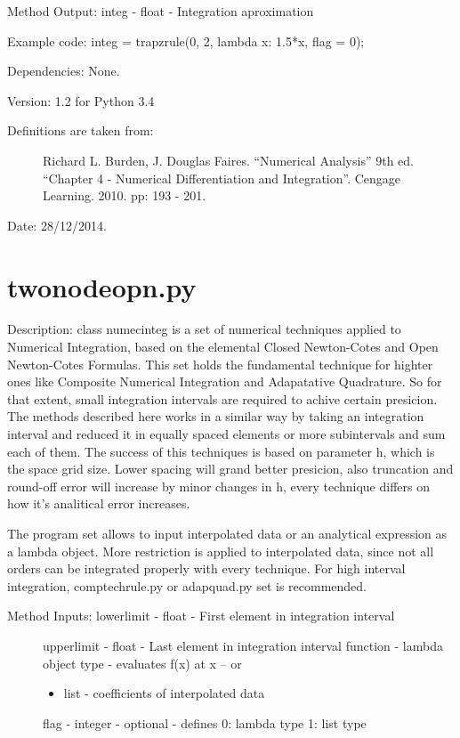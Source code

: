 \documentclass[letterpaper,10pt,oneside]{sphinxmanual}
\theoremstyle{plain}%
\theoremstyle{definition}%
\theoremstyle{remark}%
\begin{document}
Method Output: integ - float - Integration aproximation

Example code: integ = trapzrule(0, 2, lambda x: 1.5*x, flag = 0);

Dependencies: None.

Version: 1.2 for Python 3.4
\begin{description}
\item[{Definitions are taken from:}] \leavevmode
Richard L. Burden, J. Douglas Faires. ``Numerical Analysis'' 9th ed.
``Chapter 4 - Numerical Differentiation and Integration''. 
Cengage Learning. 2010. pp: 193 - 201.

\end{description}




Date: 28/12/2014.


\section{twonodeopn.py}
\label{code:module-twonodeopn}\label{code:twonodeopn-py}
Description: class numecinteg is a set of numerical techniques applied to
Numerical Integration, based on the elemental Closed Newton-Cotes and
Open Newton-Cotes Formulas. This set holds the fundamental technique for
highter ones like Composite Numerical Integration and Adapatative Quadrature.
So for that extent, small integration intervals are required to achive certain
presicion. The methods described here works in a similar way by taking an
integration interval and reduced it in equally spaced elements or more 
subintervals and sum each of them. The success of this techniques is based
on parameter h, which is the space grid size. Lower spacing will grand better
presicion, also truncation and round-off error will increase by minor changes
in h, every technique differs on how it's analitical error increases.

The program set allows to input interpolated data or an analytical expression
as a lambda object. More restriction is applied to interpolated data, since
not all orders can be integrated properly with every technique. For high 
interval integration, comptechrule.py or adapquad.py set is recommended.
\begin{description}
\item[{Method Inputs: lowerlimit - float - First element in integration interval}] \leavevmode
upperlimit - float - Last element in integration interval
function - lambda object type - evaluates f(x) at x -- or
\begin{itemize}
\item {} 
list - coefficients of interpolated data

\end{itemize}

flag - integer - optional - defines 0: lambda type 1: list type

\end{description}
\end{document}
